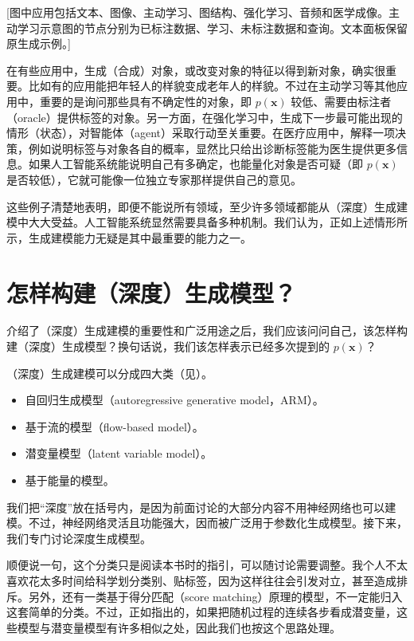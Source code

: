 [图中应用包括文本、图像、主动学习、图结构、强化学习、音频和医学成像。主动学习示意图的节点分别为已标注数据、学习、未标注数据和查询。文本面板保留原生成示例。]

在有些应用中，生成（合成）对象，或改变对象的特征以得到新对象，确实很重要。比如有的应用能把年轻人的样貌变成老年人的样貌。不过在主动学习等其他应用中，重要的是询问那些具有不确定性的对象，即 $p(\mathbf{x})$ 较低、需要由标注者（oracle）提供标签的对象。另一方面，在强化学习中，生成下一步最可能出现的情形（状态），对智能体（agent）采取行动至关重要。在医疗应用中，解释一项决策，例如说明标签与对象各自的概率，显然比只给出诊断标签能为医生提供更多信息。如果人工智能系统能说明自己有多确定，也能量化对象是否可疑（即 $p(\mathbf{x})$ 是否较低），它就可能像一位独立专家那样提供自己的意见。

这些例子清楚地表明，即便不能说所有领域，至少许多领域都能从（深度）生成建模中大大受益。人工智能系统显然需要具备多种机制。我们认为，正如上述情形所示，生成建模能力无疑是其中最重要的能力之一。

\section{怎样构建（深度）生成模型？}
\label{sec:formulation}
介绍了（深度）生成建模的重要性和广泛用途之后，我们应该问问自己，该怎样构建（深度）生成模型？换句话说，我们该怎样表示已经多次提到的 $p(\mathbf{x})$？

（深度）生成建模可以分成四大类（见）。
\begin{itemize}
\item 自回归生成模型（autoregressive generative model，ARM）。
\item 基于流的模型（flow-based model）。
\item 潜变量模型（latent variable model）。
\item 基于能量的模型。
\end{itemize}

我们把“深度”放在括号内，是因为前面讨论的大部分内容不用神经网络也可以建模。不过，神经网络灵活且功能强大，因而被广泛用于参数化生成模型。接下来，我们专门讨论深度生成模型。

顺便说一句，这个分类只是阅读本书时的指引，可以随讨论需要调整。我个人不太喜欢花太多时间给科学划分类别、贴标签，因为这样往往会引发对立，甚至造成排斥。另外，还有一类基于得分匹配（score matching）原理的模型，不一定能归入这套简单的分类。不过，正如指出的，如果把随机过程的连续各步看成潜变量，这些模型与潜变量模型有许多相似之处，因此我们也按这个思路处理。

